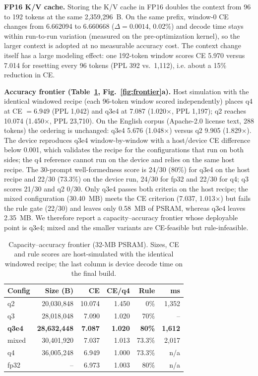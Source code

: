 \documentclass[journal,letterpaper]{IEEEtran}
\begin{document}
\textbf{FP16 K/V cache.} Storing the K/V cache in FP16 doubles the context from 96 to 192
tokens at the same 2,359,296~B. On the same prefix, window-0 CE changes from 6.662094 to
6.660668 ($\Delta=0.0014$, 0.02\%) and decode time stays within run-to-run variation (measured
on the pre-optimization kernel), so the larger context is adopted at no measurable accuracy
cost. The context change itself has a large modeling effect: one 192-token window scores CE
5.970 versus 7.014 for resetting every 96 tokens (PPL 392 vs.\ 1,112), i.e. about a 15\%
reduction in CE.

\textbf{Accuracy frontier (Table~\ref{tab:frontier}, Fig.~\ref{fig:frontier}a).} Host simulation
with the identical windowed recipe (each 96-token window scored independently) places q4 at
CE $=6.949$ (PPL 1,042) and q3e4 at 7.087 (1.020$\times$, PPL 1,197); q2 reaches 10.074
(1.450$\times$, PPL 23,710). On the English corpus (Apache-2.0 license text, 288 tokens) the
ordering is unchanged: q3e4 5.676 (1.048$\times$) versus q2 9.905 (1.829$\times$). The device
reproduces q3e4 window-by-window with a host/device CE difference below 0.001, which validates
the recipe for the configurations that run on both sides; the q4 reference cannot run on the
device and relies on the same host recipe. The 30-prompt well-formedness score is 24/30 (80\%)
for q3e4 on the host recipe and 22/30 (73.3\%) on the device run, 24/30 for fp32 and 22/30 for
q4; q3 scores 21/30 and q2 0/30. Only q3e4 passes both criteria on the host recipe; the mixed
configuration (30.40~MB) meets the CE criterion (7.037, 1.013$\times$) but fails the rule gate
(22/30) and leaves only 0.58~MB of PSRAM, whereas q3e4 leaves 2.35~MB. We therefore report a
capacity--accuracy frontier whose deployable point is q3e4; mixed and the smaller variants are
CE-feasible but rule-infeasible.

\begin{table}[t]
\centering
\caption{Capacity--accuracy frontier (32-MB PSRAM). Sizes, CE and rule scores are host-simulated with the identical windowed recipe; the last column is device decode time on the final build.}
\label{tab:frontier}
\footnotesize
\setlength{\tabcolsep}{2.5pt}
\begin{tabular}{@{}lrrrrr@{}}
\toprule
Config & Size (B) & CE & CE/q4 & Rule & ms \\
\midrule
q2 & 20,030,848 & 10.074 & 1.450 & 0\% & 1,352 \\
q3 & 28,018,048 & 7.090 & 1.020 & 70\% & -- \\
\textbf{q3e4} & \textbf{28,632,448} & \textbf{7.087} & \textbf{1.020} & \textbf{80\%} & \textbf{1,612} \\
mixed & 30,401,920 & 7.037 & 1.013 & 73.3\% & 2,017 \\
q4 & 36,005,248 & 6.949 & 1.000 & 73.3\% & n/a \\
fp32 & -- & 6.973 & 1.003 & 80\% & n/a \\
\bottomrule
\end{tabular}
\end{table}
\end{document}
